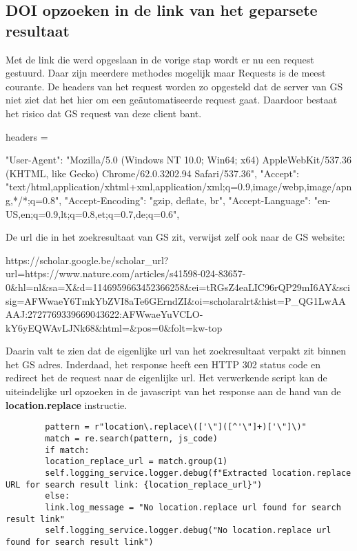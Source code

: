 \subsection{DOI opzoeken in de link van het geparsete resultaat}
Met de link die werd opgeslaan in de vorige stap wordt er nu een request gestuurd. Daar zijn meerdere methodes mogelijk maar Requests \textcite{Requests2025} is de meest courante. De headers van het request worden zo opgesteld dat de server van GS niet ziet dat het hier om een geäutomatiseerde request gaat. Daardoor bestaat het risico dat GS request van deze client bant.\\
\begin{listing}headers = {
        "User-Agent": "Mozilla/5.0 (Windows NT 10.0; Win64; x64) AppleWebKit/537.36 (KHTML, like Gecko) Chrome/62.0.3202.94 Safari/537.36",
        "Accept": "text/html,application/xhtml+xml,application/xml;q=0.9,image/webp,image/apng,*/*;q=0.8",
        "Accept-Encoding": "gzip, deflate, br",
        "Accept-Language": "en-US,en;q=0.9,lt;q=0.8,et;q=0.7,de;q=0.6",
        \caption[Voorbeeld header]{Voorbeeld headers.}
}\end{listing}
De url die in het zoekresultaat van GS zit, verwijst zelf ook naar de GS website:
\begin{listing}
    https://scholar.google.be/scholar\_url?url=https://www.nature.com/articles/s41598-024-83657-0\&hl=nl\&sa=X\&d=1146959663452366258\&ei=tRGsZ4eaLIC96rQP29mI6AY\&scisig=AFWwaeY6TmkYbZVI8aTe6GErndZI\&oi=scholaralrt\&hist=P\_QG1LwAAAAJ:2727769339669043622:AFWwaeYuVCLO-kY6yEQWAvLJNk68\&html=\&pos=0\&folt=kw-top
    \caption[Embedded url]{Embedded url.}
\end{listing}
Daarin valt te zien dat de eigenlijke url van het zoekresultaat verpakt zit binnen het GS adres.
Inderdaad, het response heeft een HTTP 302 status code en redirect het de request naar de eigenlijke url.
Het verwerkende script kan de uiteindelijke url opzoeken in de javascript van het response aan de hand van de \textbf{location.replace} instructie.
\begin{listing}
    \begin{verbatim}
        pattern = r"location\.replace\(['\"]([^'\"]+)['\"]\)"
        match = re.search(pattern, js_code)
        if match:
        location_replace_url = match.group(1)
        self.logging_service.logger.debug(f"Extracted location.replace URL for search result link: {location_replace_url}")
        else:
        link.log_message = "No location.replace url found for search result link"
        self.logging_service.logger.debug("No location.replace url found for search result link")
    \end{verbatim}
    \caption[Location replace codefragment]{Codefragment voor het vinden van de location.replace.}
 \end{listing}

